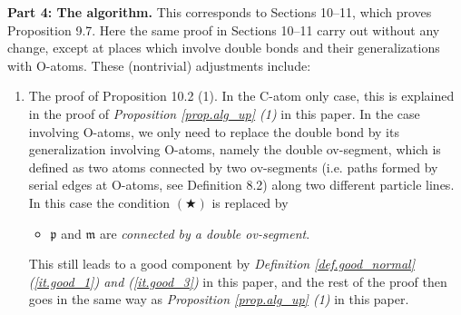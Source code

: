 \documentclass[10pt, reqno]{amsart}
\newcommand{\mf}{\mathfrak m}
\newcommand{\pf}{\mathfrak p}
\theoremstyle{definition}
\theoremstyle{remark}
\numberwithin{equation}{section}
\begin{document}
\medskip
\textbf{Part 4: The algorithm.} This corresponds to Sections 10--11, which proves Proposition 9.7. Here the same proof in Sections 10--11 carry out without any change, except at places which involve double bonds and their generalizations with O-atoms. These (nontrivial) adjustments include:
\begin{enumerate}
\item The proof of Proposition 10.2 (1). In the C-atom only case, this is explained in the proof of \emph{Proposition \ref{prop.alg_up} (1)} in this paper. In the case involving O-atoms, we only need to replace the double bond by its generalization involving O-atoms, namely the double ov-segment, which is defined as two atoms connected by two ov-segments (i.e. paths formed by serial edges at O-atoms, see Definition 8.2) along two different particle lines. In this case the condition $(\bigstar)$ is replaced by
\begin{itemize}[$(\triangle)$]
\itemindent=14pt
\item $\pf$ and $\mf$ are \emph{connected by a double ov-segment}.
\end{itemize} This still leads to a good component by \emph{Definition \ref{def.good_normal} (\ref{it.good_1}) and (\ref{it.good_3})} in this paper, and the rest of the proof then goes in the same way as \emph{Proposition \ref{prop.alg_up} (1)} in this paper.


\end{enumerate}
\end{document}
